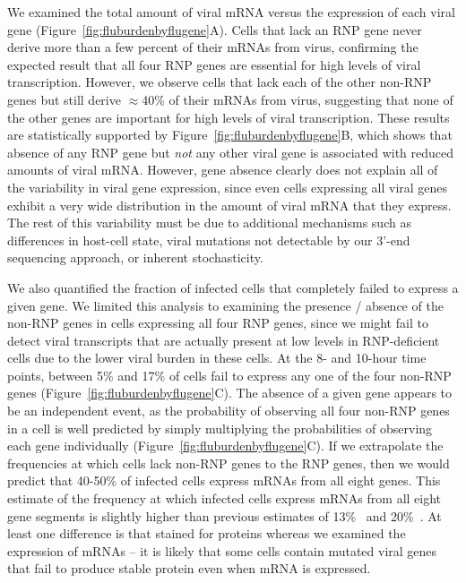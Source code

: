 \documentclass[9pt,lineno]{elife}
\begin{document}
We examined the total amount of viral mRNA versus the expression of each viral gene (Figure~\ref{fig:fluburdenbyflugene}A). 
Cells that lack an RNP gene never derive more than a few percent of their mRNAs from virus, confirming the expected result that all four RNP genes are essential for high levels of viral transcription.
However, we observe cells that lack each of the other non-RNP genes but still derive $\approx$40\% of their mRNAs from virus, suggesting that none of the other genes are important for high levels of viral transcription.
These results are statistically supported by Figure~\ref{fig:fluburdenbyflugene}B, which shows that absence of any RNP gene but \emph{not} any other viral gene is associated with reduced amounts of viral mRNA. 
However, gene absence clearly does not explain all of the variability in viral gene expression, since even cells expressing all viral genes exhibit a very wide distribution in the amount of viral mRNA that they express. 
The rest of this variability must be due to additional mechanisms such as differences in host-cell state, viral mutations not detectable by our 3'-end sequencing approach, or inherent stochasticity.  

We also quantified the fraction of infected cells that completely failed to express a given gene.
We limited this analysis to examining the presence / absence of the non-RNP genes in cells expressing all four RNP genes, since we might fail to detect viral transcripts that are actually present at low levels in RNP-deficient cells due to the lower viral burden in these cells.
At the 8- and 10-hour time points, between 5\% and 17\% of cells fail to express any one of the four non-RNP genes (Figure~\ref{fig:fluburdenbyflugene}C).
The absence of a given gene appears to be an independent event, as the probability of observing all four non-RNP genes in a cell is well predicted by simply multiplying the probabilities of observing each gene individually (Figure~\ref{fig:fluburdenbyflugene}C). 
If we extrapolate the frequencies at which cells lack non-RNP genes to the RNP genes, then we would predict that 40-50\% of infected cells express mRNAs from all eight genes.
This estimate of the frequency at which infected cells express mRNAs from all eight gene segments is slightly higher than previous estimates of 13\%~\citep{Brooke:2013kb} and 20\%~\citep{Dou:2017cp}.
At least one difference is that \citet{Brooke:2013kb} stained for proteins whereas we examined the expression of mRNAs -- it is likely that some cells contain mutated viral genes that fail to produce stable protein even when mRNA is expressed.
	
\end{document}
